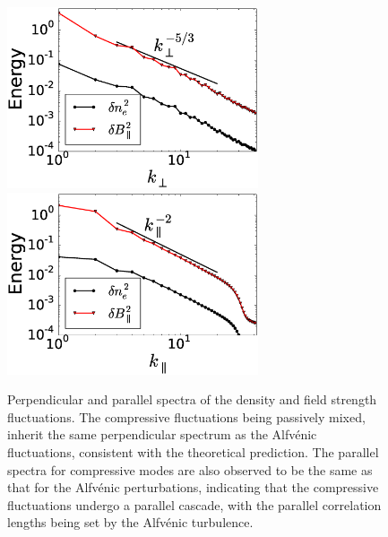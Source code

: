 \begin{figure}
\begin{center}
    \includegraphics[width=7.4cm]{figs/slowmodes/sw1_dne_kpspec.eps}
    \includegraphics[width=7.4cm]{figs/slowmodes/sw1_dne_kparspec.eps}
    \caption{Perpendicular and parallel spectra of the density and field strength
    fluctuations. The compressive fluctuations being passively mixed, inherit the same perpendicular spectrum as the Alfv\'{e}nic
    fluctuations, consistent with the theoretical prediction. 
    The parallel spectra for compressive modes are also observed to
    be the same as that for the Alfv\'{e}nic perturbations, indicating that the compressive
    fluctuations undergo a parallel cascade, with the parallel correlation lengths being
    set by the Alfv\'{e}nic turbulence.}
\label{slowmodes:fig:dnespec} 
\end{center}
\end{figure}

